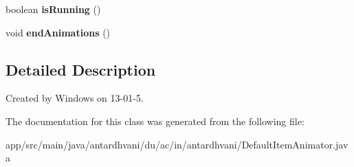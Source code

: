 \begin{DoxyCompactItemize}
\item 
\hypertarget{classantardhvani_1_1du_1_1ac_1_1in_1_1antardhvani_1_1_default_item_animator_a1ebfd13c48eaf92735033be7dd968ff6}{}boolean {\bfseries is\+Running} ()\label{classantardhvani_1_1du_1_1ac_1_1in_1_1antardhvani_1_1_default_item_animator_a1ebfd13c48eaf92735033be7dd968ff6}

\item 
\hypertarget{classantardhvani_1_1du_1_1ac_1_1in_1_1antardhvani_1_1_default_item_animator_a67978611109424743115cf50d0e27a42}{}void {\bfseries end\+Animations} ()\label{classantardhvani_1_1du_1_1ac_1_1in_1_1antardhvani_1_1_default_item_animator_a67978611109424743115cf50d0e27a42}

\end{DoxyCompactItemize}


\subsection{Detailed Description}
Created by Windows on 13-\/01-\/5. 

The documentation for this class was generated from the following file\+:\begin{DoxyCompactItemize}
\item 
app/src/main/java/antardhvani/du/ac/in/antardhvani/Default\+Item\+Animator.\+java\end{DoxyCompactItemize}
